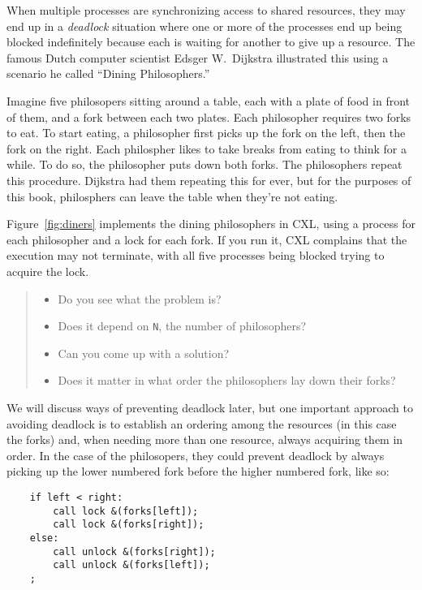 \documentclass{report}
\newenvironment{code}{
\tcolorbox
}{
\endtcolorbox
}
\begin{document}
When multiple processes are synchronizing access to shared resources, they
may end up in a \emph{deadlock} situation where one or more of the processes
end up being blocked indefinitely because each is waiting for another to give
up a resource.
The famous Dutch computer scientist Edsger W.~Dijkstra illustrated this using
a scenario he called ``Dining Philosophers.''

Imagine five philosopers sitting around a table, each with a plate of food in
front of them, and a fork between each two plates.  Each philosopher requires
two forks to eat.  To start eating, a philosopher first picks up the fork on
the left, then the fork on the right.  Each philospher likes to take breaks
from eating to think for a while.  To do so, the philosopher puts down both
forks.  The philosophers repeat this procedure.  Dijkstra had them repeating
this for ever, but for the purposes of this book, philosphers can leave
the table when they're not eating.

Figure~\ref{fig:diners} implements the dining philosophers in CXL, using a
process for each philosopher and a lock for each fork.  If you
run it, CXL complains that the execution may not terminate, with all five
processes being blocked trying to acquire the lock.

\begin{quote}
\begin{itemize}
\item Do you see what the problem is?
\item Does it depend on \texttt{N}, the number of philosophers?
\item Can you come up with a solution?
\item Does it matter in what order the philosophers lay down their forks?
\end{itemize}
\end{quote}

We will discuss ways of preventing deadlock later, but one important
approach to avoiding deadlock is to establish an ordering among the
resources (in this case the forks) and, when needing more than one
resource, always acquiring them in order.  In the case of the philosopers,
they could prevent deadlock by always picking up the lower numbered fork
before the higher numbered fork, like so:

\begin{code}
\begin{verbatim}
    if left < right:
        call lock &(forks[left]);
        call lock &(forks[right]);
    else:
        call unlock &(forks[right]);
        call unlock &(forks[left]);
    ;
\end{verbatim}
\end{code}
\end{document}
